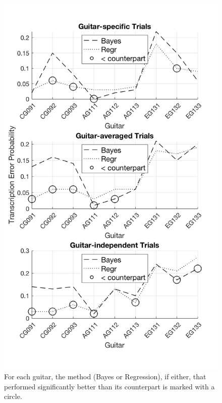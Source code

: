 \documentclass[convention,peer-reviewed]{aesconf}
\begin{document}
\begin{figure}[!t]
\centering
\includegraphics[scale=0.275]{novel-methods-sig-comp}
\caption{For each guitar, the method (Bayes or Regression), if either, that performed significantly better than its counterpart is marked with a circle.}
\label{fig:novel-methods-sig-comp}
\end{figure}
\end{document}

